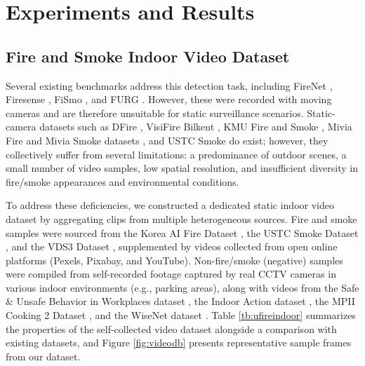 \documentclass[
  10pt,
]{article}
\begin{document}


\section{Experiments and Results}\label{sec:results}

\subsection{Fire and Smoke Indoor Video
Dataset}\label{fire-and-smoke-indoor-video-dataset}



 

Several existing benchmarks address this detection task, including
FireNet , Firesense
, FiSmo
, and FURG
. However, these were
recorded with moving cameras and are therefore unsuitable for static
surveillance scenarios. Static-camera datasets such as DFire
, VisiFire Bilkent
, KMU Fire and Smoke
, Mivia Fire and Mivia Smoke
datasets , and USTC Smoke
 do exist; however, they
collectively suffer from several limitations: a predominance of outdoor
scenes, a small number of video samples, low spatial resolution, and
insufficient diversity in fire/smoke appearances and environmental
conditions.

To address these deficiencies, we constructed a dedicated static indoor
video dataset by aggregating clips from multiple heterogeneous sources.
Fire and smoke samples were sourced from the Korea AI Fire Dataset
, the USTC Smoke Dataset
, and the VDS3 Dataset
, supplemented by videos collected
from open online platforms (Pexels, Pixabay, and YouTube).
Non-fire/smoke (negative) samples were compiled from self-recorded
footage captured by real CCTV cameras in various indoor environments
(e.g., parking areas), along with videos from the Safe \& Unsafe
Behavior in Workplaces dataset ,
the Indoor Action dataset ,
the MPII Cooking 2 Dataset
, and the WiseNet
dataset . Table
\ref{tb:ufireindoor} summarizes the properties of the self-collected
video dataset alongside a comparison with existing datasets, and Figure
\ref{fig:videodb} presents representative sample frames from our
dataset.
\end{document}
